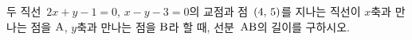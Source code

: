 두 직선~$2x+y-1=0$, $x-y-3=0$의 교점과 점~$(4,\mkern3mu 5)$를 지나는 직선이 $x$축과 만나는 점을 $\mathrm{A}$, $y$축과 만나는 점을 $\mathrm{B}$라 할 때, 선분~$\mathrm{AB}$의 길이를 구하시오.

